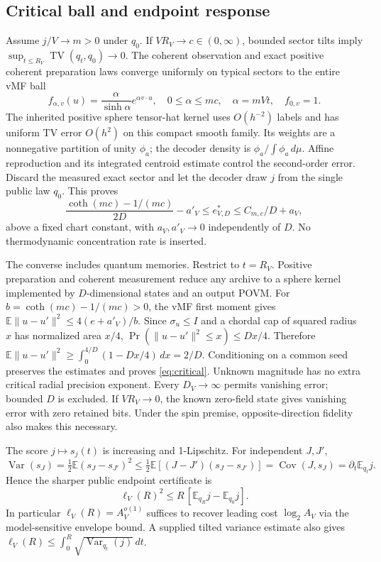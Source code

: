 \documentclass[11pt]{article}
\theoremstyle{definition}
\DeclareMathOperator{\TV}{TV}
\DeclareMathOperator{\Var}{Var}
\DeclareMathOperator{\Cov}{Cov}
\newcommand{\E}{\mathbb E}
\begin{document}
\subsection{Critical ball and endpoint response}
Assume $j/V\to m>0$ under $q_0$. If $VR_V\to c\in(0,\infty)$,
bounded sector tilts imply
$\sup_{t\le R_V}\TV(q_t,q_0)\to0$.
The coherent observation and exact positive coherent preparation laws
converge uniformly on typical sectors to the entire vMF ball
\[
 f_{\alpha,v}(u)=\frac{\alpha}{\sinh\alpha}e^{\alpha v\cdot u},
 \quad 0\le\alpha\le mc,\quad \alpha=mVt,\quad f_{0,v}=1.
\]
The inherited positive sphere tensor-hat kernel uses $O(h^{-2})$
labels and has uniform TV error $O(h^2)$ on this compact smooth
family. Its weights are a nonnegative partition of unity $\phi_a$;
the decoder density is $\phi_a/\int\phi_a\,d\mu$.
Affine reproduction and its integrated centroid estimate control the
second-order error. Discard the measured exact sector and let the
decoder draw $j$ from the single public law $q_0$. This proves
\begin{equation}\label{eq:critical}
 \frac{\coth(mc)-1/(mc)}{2D}-a'_V
 \le e^*_{V,D}\le C_{m,c}/D+a_V,
\end{equation}
above a fixed chart constant, with $a_V,a'_V\to0$ independently of
$D$. No thermodynamic concentration rate is inserted.

The converse includes quantum memories. Restrict to $t=R_V$.
Positive preparation and coherent measurement reduce any archive to
a sphere kernel implemented by $D$-dimensional states and an output
POVM. For $b=\coth(mc)-1/(mc)>0$, the vMF first moment gives
$\E\|u-u'\|^2\le4(e+a'_V)/b$.
Since $\sigma_u\le I$ and a chordal cap of squared radius $x$
has normalized area $x/4$,
$\Pr(\|u-u'\|^2\le x)\le Dx/4$. Therefore
$\E\|u-u'\|^2\ge\int_0^{4/D}(1-Dx/4)\,dx=2/D$.
Conditioning on a common seed preserves the estimates and proves
\eqref{eq:critical}. Unknown magnitude has no extra critical radial
precision exponent. Every $D_V\to\infty$ permits vanishing error;
bounded $D$ is excluded. If $VR_V\to0$, the known zero-field state
gives vanishing error with zero retained bits. Under the spin premise,
opposite-direction fidelity also makes this necessary.

The score $j\mapsto s_j(t)$ is increasing and 1-Lipschitz. For
independent $J,J'$,
\[
 \Var(s_J)=\tfrac12\E(s_J-s_{J'})^2
 \le\tfrac12\E[(J-J')(s_J-s_{J'})]
 =\Cov(J,s_J)=\partial_t\E_{q_t}j.
\]
Hence the sharper public endpoint certificate is
\[
 \ell_V(R)^2\le R\,[\E_{q_R}j-\E_{q_0}j].
\]
In particular $\ell_V(R)=A_V^{o(1)}$ suffices to recover leading
cost $\log_2 A_V$ via the model-sensitive envelope bound.
A supplied tilted variance estimate also gives
$\ell_V(R)\le\int_0^R\sqrt{\Var_{q_t}(j)}\,dt$.
\end{document}
